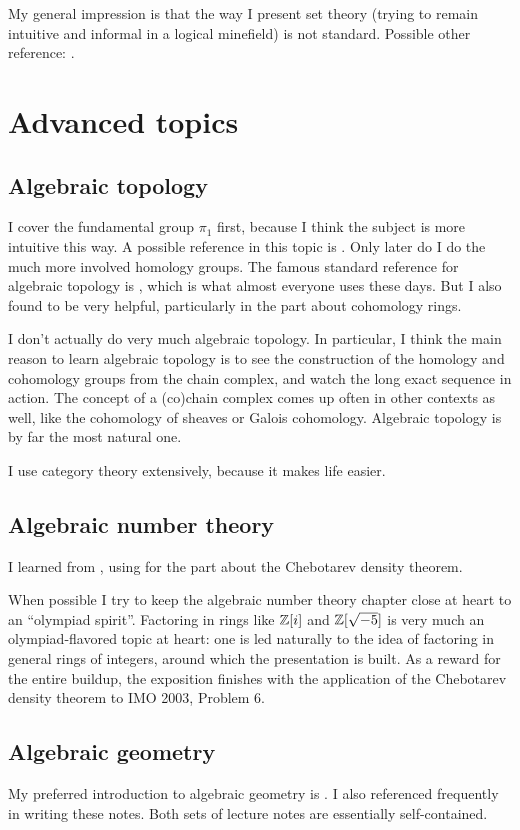 My general impression is that the way I present set theory
(trying to remain intuitive and informal in a logical minefield)
is not standard. Possible other reference: \cite{ref:miquel}.

\section{Advanced topics}
\subsection*{Algebraic topology}
I cover the fundamental group $\pi_1$ first, because I think the subject is more
intuitive this way. A possible reference in this topic is \cite{ref:munkres}.
Only later do I do the much more involved homology groups.
The famous standard reference for algebraic topology is \cite{ref:hatcher},
which is what almost everyone uses these days.
But I also found \cite{ref:maxim752} to be very helpful,
particularly in the part about cohomology rings.

I don't actually do very much algebraic topology.
In particular, I think the main reason to learn algebraic topology
is to see the construction of the homology and cohomology groups
from the chain complex, and watch the long exact sequence in action.
The concept of a (co)chain complex comes up often in other contexts as well,
like the cohomology of sheaves or Galois cohomology.
Algebraic topology is by far the most natural one.

I use category theory extensively, because it makes life easier.

\subsection*{Algebraic number theory}
I learned from \cite{ref:oggier_NT}, using \cite{ref:lenstra_chebotarev}
for the part about the Chebotarev density theorem.

When possible I try to keep the algebraic number theory chapter close at
heart to an ``olympiad spirit''.
Factoring in rings like $\mathbb Z[i]$ and $\mathbb Z[\sqrt{-5}]$
is very much an olympiad-flavored topic at heart:
one is led naturally to the idea of factoring in general rings of integers,
around which the presentation is built.
As a reward for the entire buildup, the exposition finishes
with the application of the Chebotarev density theorem to IMO 2003, Problem 6.

\subsection*{Algebraic geometry}
My preferred introduction to algebraic geometry is \cite{ref:gathmann}.
I also referenced \cite{ref:vakil} frequently in writing these notes.
Both sets of lecture notes are essentially self-contained.

